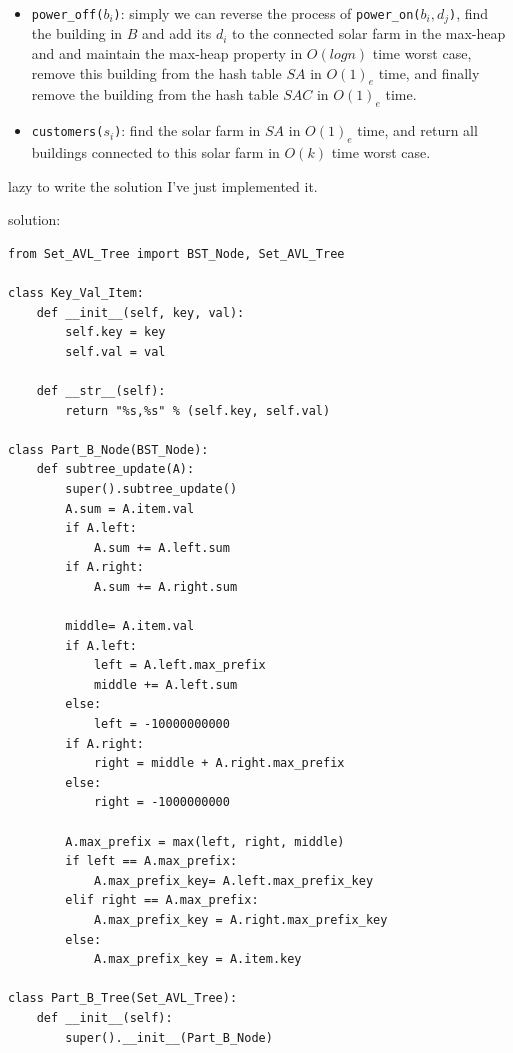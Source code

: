 \documentclass[12pt,twoside]{article}
\begin{document}
\begin{problems}
\begin{itemize}
\item {\tt power\_off($b_i$)}: simply we can reverse the process of {\tt power\_on($b_i, d_j$)}, 
    find the building in $B$ and add its $d_i$ to the connected solar farm in the max-heap and 
    and maintain the max-heap property in $O(log{n})$ time worst case, remove this building from the hash table $SA$ 
    in $O(1)_e$ time, and finally remove the building from the hash table $SAC$ in $O(1)_e$ time.

\item {\tt customers($s_i$)}: find the solar farm in $SA$ in $O(1)_e$ time, and return all buildings connected
    to this solar farm in $O(k)$ time worst case.
    
\end{itemize}
  

\newpage
\problem  %


\newpage
\problem  %
\begin{problemparts}
\problempart %
lazy to
\problempart %
write the solution 
\problempart %
I've just implemented it.

\problempart
solution: 
\begin{lstlisting}
from Set_AVL_Tree import BST_Node, Set_AVL_Tree

class Key_Val_Item:
    def __init__(self, key, val):
        self.key = key
        self.val = val

    def __str__(self): 
        return "%s,%s" % (self.key, self.val)

class Part_B_Node(BST_Node):
    def subtree_update(A):
        super().subtree_update()
        A.sum = A.item.val
        if A.left:
            A.sum += A.left.sum
        if A.right:
            A.sum += A.right.sum
        
        middle= A.item.val
        if A.left:
            left = A.left.max_prefix
            middle += A.left.sum
        else:
            left = -10000000000
        if A.right:
            right = middle + A.right.max_prefix
        else:
            right = -1000000000

        A.max_prefix = max(left, right, middle)
        if left == A.max_prefix:
            A.max_prefix_key= A.left.max_prefix_key
        elif right == A.max_prefix:
            A.max_prefix_key = A.right.max_prefix_key
        else:
            A.max_prefix_key = A.item.key

class Part_B_Tree(Set_AVL_Tree):
    def __init__(self): 
        super().__init__(Part_B_Node)


\end{lstlisting}
\end{problemparts}
\end{problems}
\end{document}
